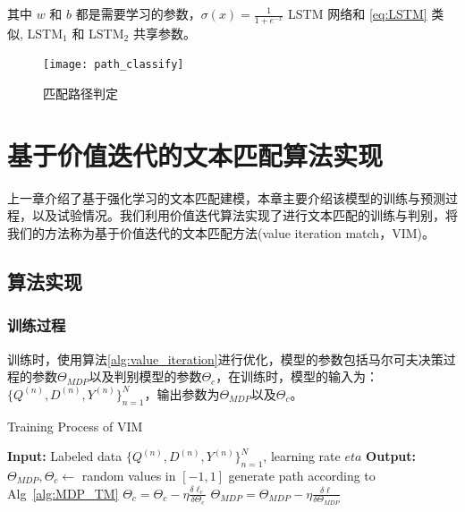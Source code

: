 其中 $w$ 和 $b$ 都是需要学习的参数，$\sigma(x) = \frac{1}{1+e^{-x}}$
LSTM 网络和 \ref{eq:LSTM} 类似, LSTM$_1$  和 LSTM$_2$ 共享参数。
\begin{figure}[!htbp]
    \centering
    \vspace{1em}
    \texttt{[image: path\_classify]}
    \caption{匹配路径判定}
    \label{fig:path_classify}
    \vspace{1em}
\end{figure}


\chapter{基于价值迭代的文本匹配算法实现}
上一章介绍了基于强化学习的文本匹配建模，本章主要介绍该模型的训练与预测过程，以及试验情况。我们利用价值迭代算法实现了进行文本匹配的训练与判别，将我们的方法称为基于价值迭代的文本匹配方法(value iteration match，VIM)。
\section{算法实现}

\subsection{训练过程}

训练时，使用算法\ref{alg:value_iteration}进行优化，模型的参数包括马尔可夫决策过程的参数$\Theta_{MDP}$以及判别模型的参数$\Theta_c$，在训练时，模型的输入为：$\{Q^{(n)}, D^{(n)}, Y^{(n)}\}_{n=1}^N$，输出参数为$\Theta_{MDP}$以及$\Theta_c$。

\begin{algorithm}[!htbp]
	\small
	\caption{Training Process of VIM}
	\label{alg:VIM_train}
	\begin{algorithmic}
		\STATE \textbf{Input:} Labeled data $\{Q^{(n)}, D^{(n)}, Y^{(n)}\}_{n=1}^N$, learning rate $eta$
		\STATE \textbf{Output:} $\Theta_{MDP}, \Theta_{c} \leftarrow$ random values in $[-1, 1]$
			\STATE generate path according to Alg~\ref{alg:MDP_TM}
				\STATE $\Theta_{c} = \Theta_{c} - \eta \frac{\delta \ell_c}{\delta \Theta_{c}}$ 
			\ENDWHILE
			\STATE $\Theta_{MDP} = \Theta_{MDP} - \eta \frac{\delta \ell}{\delta \Theta_{MDP}}$ 
			\ENDWHILE
	\end{algorithmic}	
\end{algorithm}


